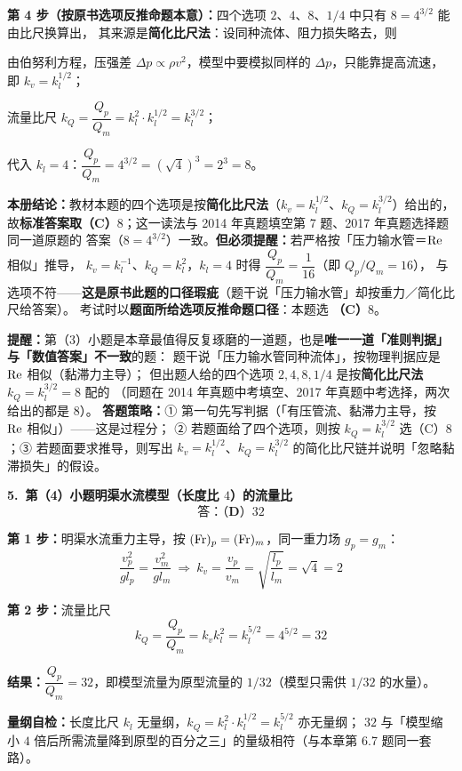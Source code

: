 \begin{jie}
\textbf{第 4 步（按原书选项反推命题本意）：}四个选项 $2$、$4$、$8$、$1/4$ 中只有 $8=4^{3/2}$ 能由比尺换算出，
其来源是\textbf{简化比尺法}：设同种流体、阻力损失略去，则
\begin{xiaowen}
\item 由伯努利方程，压强差 $\Delta p\propto\rho v^{2}$，模型中要模拟同样的 $\Delta p$，只能靠提高流速，
即 $k_v=k_l^{1/2}$；
\item 流量比尺 $k_Q=\dfrac{Q_p}{Q_m}=k_l^{2}\cdot k_l^{1/2}=k_l^{3/2}$；
\item 代入 $k_l=4$：$\dfrac{Q_p}{Q_m}=4^{3/2}=\left(\sqrt{4}\right)^{3}=2^{3}=8$。
\end{xiaowen}
\textbf{本册结论：}教材本题的四个选项是按\textbf{简化比尺法}（$k_v=k_l^{1/2}$、$k_Q=k_l^{3/2}$）给出的，
故\textbf{标准答案取（C）$8$}；这一读法与 2014 年真题填空第 7 题、2017 年真题选择题同一道原题的
答案（$8=4^{3/2}$）一致。\textbf{但必须提醒：}若严格按「压力输水管＝$\mathrm{Re}$ 相似」推导，
$k_v=k_l^{-1}$、$k_Q=k_l^{2}$，$k_l=4$ 时得 $\dfrac{Q_p}{Q_m}=\dfrac{1}{16}$（即 $Q_p/Q_m=16$），
与选项不符——\textbf{这是原书此题的口径瑕疵}（题干说「压力输水管」却按重力／简化比尺给答案）。
考试时以\textbf{题面所给选项反推命题口径}：本题选 \textbf{（C）$8$}。
\end{jie}

\begin{tishi}
\textbf{提醒：}第（3）小题是本章最值得反复琢磨的一道题，也是\textbf{唯一一道「准则判据」与「数值答案」不一致}的题：
题干说「压力输水管同种流体」，按物理判据应是 $\mathrm{Re}$ 相似（黏滞力主导）；
但出题人给的四个选项 $2,4,8,1/4$ 是按\textbf{简化比尺法} $k_Q=k_l^{3/2}=8$ 配的
（同题在 2014 年真题中考填空、2017 年真题中考选择，两次给出的都是 $8$）。
\textbf{答题策略：}① 第一句先写判据（「有压管流、黏滞力主导，按 $\mathrm{Re}$ 相似」）——这是过程分；
② 若题面给了四个选项，则按 $k_Q=k_l^{3/2}$ 选（C）$8$；③ 若题面要求推导，则写出
$k_v=k_l^{1/2}$、$k_Q=k_l^{3/2}$ 的简化比尺链并说明「忽略黏滞损失」的假设。
\end{tishi}

\begin{jie}
\textbf{5.\ 第（4）小题\quad 明渠水流模型（长度比 $4$）的流量比}
\[ \textbf{答：（D）$32$} \]

\textbf{第 1 步：}明渠水流重力主导，按 $(\mathrm{Fr})_p=(\mathrm{Fr})_m$，同一重力场 $g_p=g_m$：
\[ \frac{v_p^{2}}{g l_p}=\frac{v_m^{2}}{g l_m}\ \Longrightarrow\ k_v=\frac{v_p}{v_m}=\sqrt{\frac{l_p}{l_m}}=\sqrt{4}=2 \]

\textbf{第 2 步：}流量比尺
\[ k_Q=\frac{Q_p}{Q_m}=k_vk_l^{2}=k_l^{5/2}=4^{5/2}=32 \]

\textbf{结果：}$\dfrac{Q_p}{Q_m}=32$，即模型流量为原型流量的 $1/32$（模型只需供 $1/32$ 的水量）。

\textbf{量纲自检：}长度比尺 $k_l$ 无量纲，$k_Q=k_l^{2}\cdot k_l^{1/2}=k_l^{5/2}$ 亦无量纲；
$32$ 与「模型缩小 $4$ 倍后所需流量降到原型的百分之三」的量级相符（与本章第 6.7 题同一套路）。
\end{jie}

